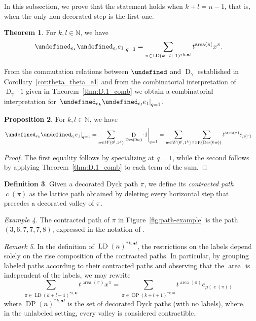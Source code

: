 \documentclass[reqno]{amsart}
\theoremstyle{plain}
\theoremstyle{definition}
\newtheorem{theorem}{Theorem}[section]
\newtheorem{definition}[theorem]{Definition}
\newtheorem{proposition}[theorem]{Proposition}
\theoremstyle{remark}
\newtheorem{remark}[theorem]{Remark}
\newtheorem{example}[theorem]{Example}
\DeclareMathOperator{\D}{D}
\DeclareMathOperator{\LD}{LD}
\DeclareMathOperator{\R}{R}
\DeclareMathOperator{\DP}{DP}
\DeclareMathOperator{\area}{area}
\DeclareMathOperator{\Des}{Des}
\DeclareMathOperator{\cc}{c}
\let\oldTheta\Theta
\let\Theta\undefined
\DeclareMathOperator{\Theta}{\oldTheta}
\newcommand{\<}{\langle}
\renewcommand{\>}{\rangle}
\begin{document}
In this subsection, we prove that the statement holds when $k+l=n-1$, that is, when the only non-decorated step is the first one.

\begin{theorem}
    \label{thm:theta_theta_e1}
    For $k,l \in \mathbb{N}$, we have
    \[ \left.\Theta_{e_k} \Theta_{e_l} e_1 \right\rvert_{q=1} = \sum_{\pi \in \LD(k+l+1)^{\ast k, \bullet l}} t^{\area(\pi)} x^\pi. \]
\end{theorem}

From the commutation relations between $\Theta$ and $\D_\gamma$ established in Corollary~\ref{cor:theta_theta_e1} and from the combinatorial interpretation of $\D_\gamma\cdot1$ given in Theorem~\ref{thm:D.1_comb} we obtain a combinatorial interpretation for $\left.\Theta_{e_k} \Theta_{e_l} e_1 \right|_{q=1}$.

\begin{proposition}
    For $k,l \in \mathbb{N}$, we have
    \[ 
        \left.\Theta_{e_k} \Theta_{e_l} e_1 \right|_{q=1} 
        = \sum_{w\in W\left(0^l,1^k\right)} \left. \D_{\Des(0w)}\cdot 1\right|_{q=1}=\sum_{w\in W\left(0^l,1^k\right)}\sum_{\tau\in \R(\Des(0w))}t^{\area(\tau)}e_{\mu(\tau)}
    \]
\end{proposition}

\begin{proof}
    The first equality follows by specializing  at $q=1$, while the second follows by applying Theorem~\ref{thm:D.1_comb} to each term of the sum.
\end{proof}

\begin{definition}
    Given a decorated Dyck path $\pi$, %
    we define its \emph{contracted path $\cc(\pi)$} as the lattice path obtained by deleting every horizontal step that precedes a decorated valley of $\pi$. 
\end{definition}

\begin{example}
    The contracted path of $\pi$ in Figure~\ref{fig:path-example} is the path $(3,6,7,7,7,8)$, expressed in the notation of .
\end{example}

\begin{remark}
    In the definition of $\LD(n)^{\ast k, \bullet l}$, the restrictions on the labels depend solely on the rise composition of the contracted paths. In particular, by grouping labeled paths according to their contracted paths and observing that the $\area$ is independent of the labels, we may rewrite
    \[
        \sum_{\pi \in \LD(k+l+1)^{\ast k, \bullet l}} t^{\area(\pi)} x^\pi
        = \sum_{\pi \in \DP(k+l+1)^{\ast k, \bullet l}} t^{\area(\pi)} e_{\mu(\cc(\pi))}
    \]
    where $\DP(n)^{\ast k, \bullet l}$ is the set of decorated Dyck paths (with no labels), where, in the unlabeled setting, every valley is considered contractible.
\end{remark}
\end{document}
